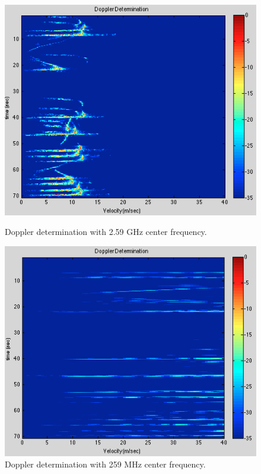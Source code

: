 \documentclass{article}
\begin{document}
\begin{figure}[ht]
\begin{minipage}[b]{0.33\linewidth}
\centering
\includegraphics[width=\textwidth]{Figures/f_c_normal.png}
\caption{Doppler determination with 2.59 GHz center frequency.}
\label{fig:f_c_normal}
\end{minipage}
\begin{minipage}[b]{0.33\linewidth}
\centering
\includegraphics[width=\textwidth]{Figures/f_c_reduced.png}
\caption{Doppler determination with 259 MHz center frequency.}

\end{minipage}
\end{figure}
\end{document}
